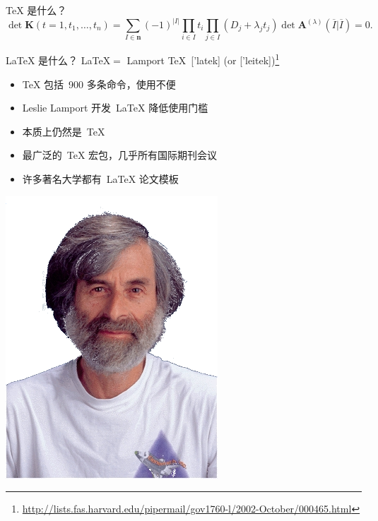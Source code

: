 \documentclass[dvipsnames, svgnames, mode=present, paper=screen, size=9pt,
style=husky]{powerdot}
\newcommand{\envert}[1]{\left\lvert#1\right\rvert}
\begin{document}
\begin{CJK*}{GBK}{song}
\begin{slide}[]{\TeX{} 是什么？}
\begin{equation}
\det\mathbf{K}(t=1,t_1,\dots,t_n)=\sum_{I\in\mathbf{n}}(-1)^{\envert{I}}
\prod_{i\in I}t_i\prod_{j\in I}(D_j+\lambda_jt_j)\det\mathbf{A}
^{(\lambda)}(\overline{I}|\overline{I})=0.
\end{equation} 
\end{slide}

\begin{slide}{\LaTeX{} 是什么？}
\LaTeX $=$ Lamport \TeX~['latek] (or ['leitek])\footnote{\url{http://lists.fas.harvard.edu/pipermail/gov1760-l/2002-October/000465.html}}
  \begin{itemize}
  \item \TeX{} 包括~900 多条命令，使用不便
  \item Leslie Lamport 开发~\LaTeX{} 降低使用门槛
  \item 本质上仍然是~\TeX{}
  \item 最广泛的~\TeX{} 宏包，几乎所有国际期刊会议
  \item 许多著名大学都有~\LaTeX{} 论文模板
  \end{itemize}
\bigskip

\centering
\includegraphics[scale=0.2]{lamport.png}\hspace{2cm}\scalebox{2}{\LaTeX}
\end{slide}


\end{CJK*}
\end{document}
